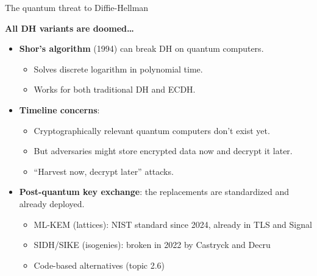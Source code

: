 \ifdefined\PRESENTATION\else\PassOptionsToClass{handout}{beamer}\fi\documentclass[aspectratio=169, lualatex]{beamer}
\begin{document}
\begin{frame}{The quantum threat to Diffie-Hellman}
	\begin{center}
		\Large\textbf{All DH variants are doomed\ldots}
	\end{center}
	\vspace{0.1cm}
	\begin{itemize}[<+->]
		\item \textbf{Shor's algorithm} (1994) can break DH on quantum computers.
		      \begin{itemize}
			      \item Solves discrete logarithm in polynomial time.
			      \item Works for both traditional DH and ECDH.
		      \end{itemize}
		\item \textbf{Timeline concerns}:
		      \begin{itemize}
			      \item Cryptographically relevant quantum computers don't exist yet.
			      \item But adversaries might store encrypted data now and decrypt it later.
			      \item ``Harvest now, decrypt later'' attacks.
		      \end{itemize}
		\item \textbf{Post-quantum key exchange}: the replacements are standardized and already deployed.
		      \begin{itemize}
			      \item ML-KEM (lattices): NIST standard since 2024, already in TLS and Signal
			      \item SIDH/SIKE (isogenies): broken in 2022 by Castryck and Decru
			      \item Code-based alternatives (topic 2.6)
		      \end{itemize}
	\end{itemize}
\end{frame}
\end{document}
